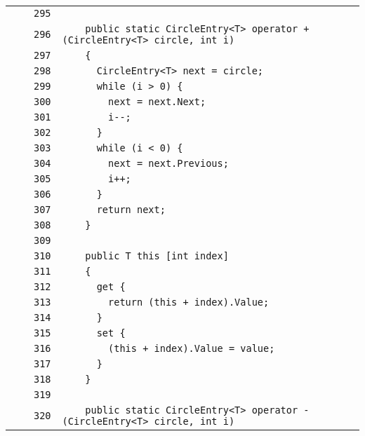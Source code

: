 \documentclass[a4paper,10pt]{article}
\begin{document}
\begin{longtable}[l]{lrrl}
\cellcolor{gray} &  & \verb~295~ & \verb~~\\
\cellcolor{gray} &  & \verb~296~ & \verb~    public static CircleEntry<T> operator + (CircleEntry<T> circle, int i)~\\
\cellcolor{gray} &  & \verb~297~ & \verb~    {~\\
\cellcolor{gray} &  & \verb~298~ & \verb~      CircleEntry<T> next = circle;~\\
\cellcolor{gray} &  & \verb~299~ & \verb~      while (i > 0) {~\\
\cellcolor{gray} &  & \verb~300~ & \verb~        next = next.Next;~\\
\cellcolor{gray} &  & \verb~301~ & \verb~        i--;~\\
\cellcolor{gray} &  & \verb~302~ & \verb~      }~\\
\cellcolor{gray} &  & \verb~303~ & \verb~      while (i < 0) {~\\
\cellcolor{gray} &  & \verb~304~ & \verb~        next = next.Previous;~\\
\cellcolor{gray} &  & \verb~305~ & \verb~        i++;~\\
\cellcolor{gray} &  & \verb~306~ & \verb~      }~\\
\cellcolor{gray} &  & \verb~307~ & \verb~      return next;~\\
\cellcolor{gray} &  & \verb~308~ & \verb~    }~\\
\cellcolor{gray} &  & \verb~309~ & \verb~~\\
\cellcolor{gray} &  & \verb~310~ & \verb~    public T this [int index]~\\
\cellcolor{gray} &  & \verb~311~ & \verb~    {~\\
\cellcolor{gray} &  & \verb~312~ & \verb~      get {~\\
\cellcolor{gray} &  & \verb~313~ & \verb~        return (this + index).Value;~\\
\cellcolor{gray} &  & \verb~314~ & \verb~      }~\\
\cellcolor{gray} &  & \verb~315~ & \verb~      set {~\\
\cellcolor{gray} &  & \verb~316~ & \verb~        (this + index).Value = value;~\\
\cellcolor{gray} &  & \verb~317~ & \verb~      }~\\
\cellcolor{gray} &  & \verb~318~ & \verb~    }~\\
\cellcolor{gray} &  & \verb~319~ & \verb~~\\
\cellcolor{gray} &  & \verb~320~ & \verb~    public static CircleEntry<T> operator - (CircleEntry<T> circle, int i)~\\

\end{longtable}
\end{document}
